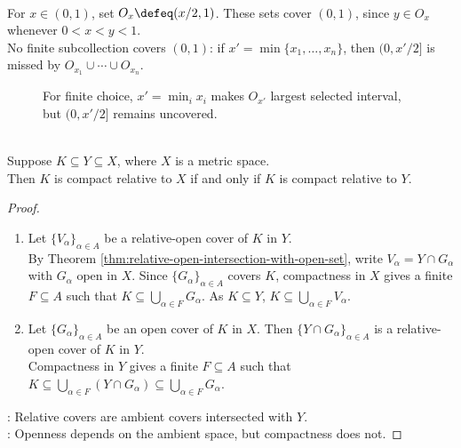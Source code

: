 \begin{example} \label{ex:open-interval-cover-without-finite-subcover} \\
For $x\in(0,1)$, set $O_x\defeq(x/2,1)$. These sets cover $(0,1)$, since $y\in O_x$ whenever $0<x<y<1$.\\
No finite subcollection covers $(0,1)$: if $x'=\min\{x_1,\ldots,x_n\}$, then $(0,x'/2]$ is missed by $O_{x_1}\cup\cdots\cup O_{x_n}$.
\end{example}

\begin{figure}[H]
  \centering
  
  \caption{For finite choice, $x'=\min_i x_i$ makes $O_{x'}$ largest selected interval, but $(0,x'/2]$ remains uncovered.}
  \label{fig:open-cover-no-finite-subcover}
\end{figure}

\begin{theorem} \label{thm:compactness-independent-of-ambient-space} \\
Suppose $K\subseteq Y\subseteq X$, where $X$ is a metric space.\\
Then $K$ is compact relative to $X$ if and only if $K$ is compact relative to $Y$.
\begin{proof}
\begin{enumerate}[label=\roman*.]
\setlength{\itemsep}{0pt}
\item[$(\Rightarrow)$] Let $\{V_\alpha\}_{\alpha\in A}$ be a relative-open cover of $K$ in $Y$.\\
By Theorem \ref{thm:relative-open-intersection-with-open-set}, write $V_\alpha=Y\cap G_\alpha$ with $G_\alpha$ open in $X$. Since $\{G_\alpha\}_{\alpha\in A}$ covers $K$, compactness in $X$ gives a finite $F\subseteq A$ such that $K\subseteq\bigcup_{\alpha\in F}G_\alpha$. As $K\subseteq Y$, $K\subseteq\bigcup_{\alpha\in F}V_\alpha$.
\item[$(\Leftarrow)$] Let $\{G_\alpha\}_{\alpha\in A}$ be an open cover of $K$ in $X$. Then $\{Y\cap G_\alpha\}_{\alpha\in A}$ is a relative-open cover of $K$ in $Y$.\\
Compactness in $Y$ gives a finite $F\subseteq A$ such that $K\subseteq\bigcup_{\alpha\in F}(Y\cap G_\alpha)\subseteq\bigcup_{\alpha\in F}G_\alpha$.
\end{enumerate}
: Relative covers are ambient covers intersected with $Y$.\\
: Openness depends on the ambient space, but compactness does not.
\end{proof}
\end{theorem}

